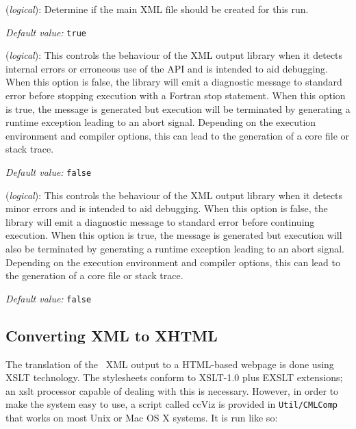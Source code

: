 \begin{description}
\itemsep 10pt
\parsep 0pt


\item[\textbf{XML.Write}] (\textit{logical}): 
Determine if the main XML file should be created for this run.

\textit{Default value:} \texttt{true}

\item[\textbf{XML.AbortOnErrors}] (\textit{logical}): 
This controls the behaviour of the XML output library when it detects 
internal errors or erroneous use of the API and is intended to aid debugging.
When this option is false, the library will emit a diagnostic message to 
standard error before stopping execution with a Fortran stop statement.
When this option is true, the message is generated but execution will be 
terminated by generating a runtime exception leading to an abort signal. 
Depending on the execution environment and compiler options, this can lead 
to the generation of a core file or stack trace. 

\textit{Default value:} \texttt{false}

\item[\textbf{XML.AbortOnWarnings}] (\textit{logical}): 
This controls the behaviour of the XML output library when it detects 
minor errors and is intended to aid debugging.  When this option is false,
the library will emit a diagnostic message to standard error before 
continuing execution. When this option is true, the message is generated 
but execution will also be terminated by generating a runtime exception 
leading to an abort signal. Depending on the execution environment and 
compiler options, this can lead to the generation of a core file or 
stack trace.

\textit{Default value:} \texttt{false}

\end{description}

\subsection{Converting XML to XHTML}

The translation of the \siesta\ XML output to a HTML-based webpage is
done using XSLT technology. The stylesheets conform to XSLT-1.0 plus
EXSLT extensions; an xslt processor capable of dealing with this is
necessary. However, in order to make the system easy to use, a script
called ccViz is provided in \texttt{Util/CMLComp} that works on most Unix or
Mac OS X systems. It is run like so:

